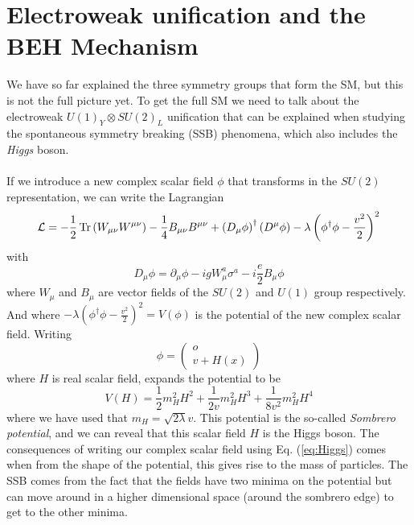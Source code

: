 \documentclass[12pt, a4paper]{book}
\begin{document}
\section{Electroweak unification and the BEH Mechanism}
We have so far explained the three symmetry groups that form the SM, but this is not the full picture yet. To get the full SM we need to talk about the electroweak $U(1)_Y\otimes SU(2)_L$ unification that can be explained when studying the spontaneous symmetry breaking (SSB) phenomena, 
which also includes the \textit{Higgs} boson. \\
\\If we introduce a new complex scalar field $\phi$ that transforms in the $SU(2)$ representation, we can write the Lagrangian
\begin{equation}\label{eq:electroweak}
    \mathcal{L}=-\frac{1}{2}\Tr\left(W_{\mu\nu}W^{\mu\nu}\right)-\frac{1}{4}B_{\mu\nu}B^{\mu\nu}+\left(D_\mu \phi\right)^\dagger\left(D^\mu \phi\right) -\lambda\left(\phi^\dagger \phi -\frac{v^2}{2}\right)^2
\end{equation}
with 
\begin{equation}\label{eq:covar_higgs}
    D_\mu \phi =\partial_\mu \phi -igW_\mu^a\sigma^a-i\frac{e}{2}B_\mu \phi
\end{equation}
where $W_\mu$ and $B_\mu$ are vector fields of the $SU(2)$ and $U(1)$ group respectively. And where $ -\lambda\left(\phi^\dagger \phi -\frac{v^2}{2}\right)^2 = V(\phi)$ is the potential of the new complex scalar field. 
Writing 
\begin{equation}\label{eq:Higgs}
    \phi = \begin{pmatrix}
        o\\v+H(x)
    \end{pmatrix}
\end{equation}
where $H$ is real scalar field, expands the potential to be
\begin{equation}\label{eq:sombrero}
    V(H) =\frac{1}{2}m_H^2H^2 + \frac{1}{2v}m_H^2H^3 +\frac{1}{8v^2}m_H^2H^4
\end{equation}
where we have used that $m_H = \sqrt{2\lambda}v$. This potential is the so-called \textit{Sombrero potential}, and we can reveal that this scalar field $H$ is the Higgs boson. 
The consequences of writing our complex scalar field using Eq. (\ref{eq:Higgs}) comes when from the shape of the potential, this gives rise to the mass of particles. The SSB comes from the fact that the fields have two minima 
on the potential but can move around in a higher dimensional space (around the sombrero edge) to get to the other minima.\\
\end{document}
